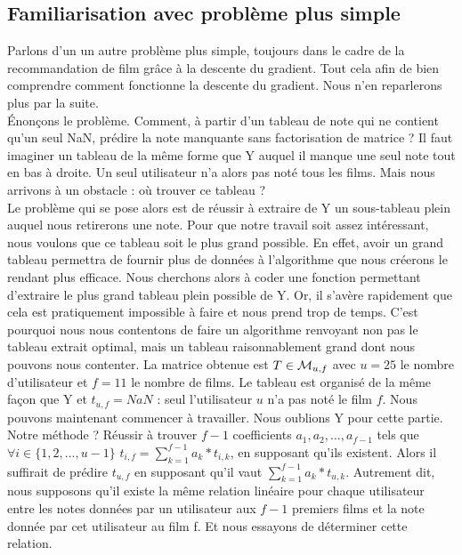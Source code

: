 \documentclass[a4paper,10pt]{article}
\begin{document}
\subsection{Familiarisation avec problème plus simple}

Parlons d'un un autre problème plus simple, toujours dans le cadre de la recommandation de film grâce à la descente du gradient. Tout cela afin de bien comprendre comment fonctionne la descente du gradient. Nous n'en reparlerons plus par la suite.\\

Énonçons le problème. Comment, à partir d'un tableau de note qui ne contient qu'un seul NaN, prédire la note manquante sans factorisation de matrice ? Il faut imaginer un tableau de la même forme que Y auquel il manque une seul note tout en bas à droite. Un seul utilisateur n'a alors pas noté tous les films. Mais nous arrivons à un obstacle : où trouver ce tableau ?\\

Le problème qui se pose alors est de réussir à extraire de Y un sous-tableau plein auquel nous retirerons une note. Pour que notre travail soit assez intéressant, nous voulons que ce tableau soit le plus grand possible. En effet, avoir un grand tableau permettra de fournir plus de données à l'algorithme que nous créerons le rendant plus efficace. Nous cherchons alors à coder une fonction permettant d'extraire le plus grand tableau plein possible de Y. Or, il s'avère rapidement que cela est pratiquement impossible à faire et nous prend trop de temps. C'est pourquoi nous nous contentons de faire un algorithme renvoyant non pas le tableau extrait optimal, mais un tableau raisonnablement grand dont nous pouvons nous contenter. La matrice obtenue est $T \in {\cal M}_{u, f}$ avec $u = 25$ le nombre d'utilisateur et $f = 11$ le nombre de films. Le tableau est organisé de la même façon que Y et $t_{u, f} = NaN$ : seul l'utilisateur $u$ n'a pas noté le film $f$. Nous pouvons maintenant commencer à travailler. Nous oublions Y pour cette partie.\\

Notre méthode ? Réussir à trouver $f-1$ coefficients $a_1, a_2, ..., a_{f-1}$ tels que $\forall i \in \{1, 2, ..., u-1\}$ $t_{i, f} = \sum_{k = 1}^{f-1} a_k * t_{i, k}$, en supposant qu'ils existent. Alors il suffirait de prédire $t_{u, f}$ en supposant qu'il vaut $\sum_{k = 1}^{f-1} a_k * t_{u, k}$. Autrement dit, nous supposons qu'il existe la même relation linéaire pour chaque utilisateur entre les notes données par un utilisateur aux $f- 1$ premiers films et la note donnée par cet utilisateur au film f. Et nous essayons de déterminer cette relation.\\
\end{document}
